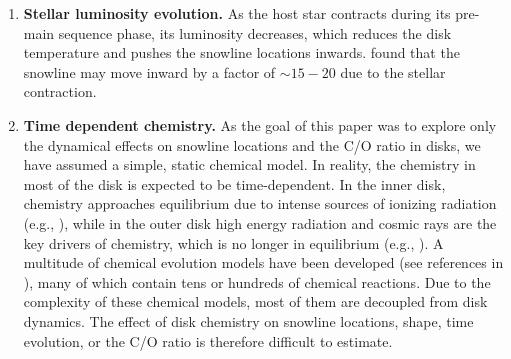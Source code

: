 \documentclass[apj]{emulateapj}
\newcommand{\emgr}[1]{\emph{ \color{gray} #1}}
\begin{document}
\begin{enumerate}

\item \textbf{Stellar luminosity evolution.} As the host star contracts during its pre-main sequence phase, its luminosity decreases, which reduces the disk temperature and pushes the snowline locations inwards. \citet{kennedy06} found that the snowline may move inward by a factor of $\sim$$15-20$ due to the stellar contraction. 

\item \textbf{Time dependent chemistry.} As the goal of this paper was to explore only the dynamical effects on snowline locations and the C/O ratio in disks, we have assumed a simple, static chemical model. In reality, the chemistry in most of the disk is expected to be time-dependent.%
In the inner disk, chemistry approaches equilibrium due to intense sources of ionizing radiation (e.g., \citealt{ilgner04}), while in the outer disk high energy radiation and cosmic rays are the key drivers of chemistry, which is no longer in equilibrium (e.g., \citealt{vandishoeck06}). A multitude of chemical evolution models have been developed (see references in \citealt{henning13}), many of which contain tens or hundreds of chemical reactions. Due to the complexity of these chemical models, most of them are decoupled from disk dynamics. The effect of disk chemistry on snowline locations, shape, time evolution, or the C/O ratio is therefore difficult to estimate.  %


\end{enumerate}



\end{document}
